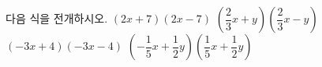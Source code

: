 다음 식을 전개하시오.
 $(2x+7)(2x-7)$
 $\left(\dfrac{2}{3}x+y\right)\left(\dfrac{2}{3}x-y\right)$
 $(-3x+4)(-3x-4)$
 $\left(-\dfrac{1}{5}x+\dfrac{1}{2}y\right)\left(\dfrac{1}{5}x+\dfrac{1}{2}y\right)$
